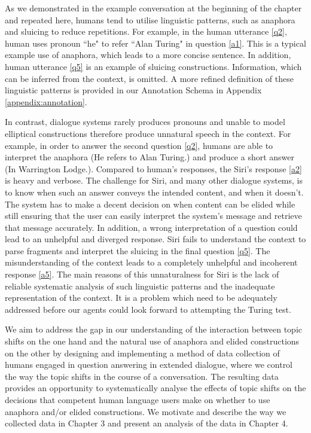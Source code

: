 \documentclass[bsc,frontabs,twoside,singlespacing,parskip,deptreport]{infthesis}     %
\begin{document}
As we demonstrated in the example conversation at the beginning of the chapter and repeated here, humans tend to utilise linguistic patterns, such as anaphora and sluicing to reduce repetitions. For example, in the human utterance \ref{q2}, human uses pronoun ``he" to refer ``Alan Turing" in question \ref{a1}. This is a typical example use of anaphora, which leads to a more concise sentence. In addition, human utterance \ref{q5} is an example of sluicing constructions. Information, which can be inferred from the context, is omitted. A more refined definition of these linguistic patterns is provided in our Annotation Schema in Appendix \ref{appendix:annotation}.

In contrast, dialogue systems rarely produces pronouns and unable to model elliptical constructions therefore produce unnatural speech in the context. For example, in order to answer the second question \ref{q2}, humans are able to interpret the anaphora (He refers to Alan Turing.) and produce a short answer (In Warrington Lodge.). Compared to human's responses, the Siri's response \ref{a2} is heavy and verbose. The challenge for Siri, and many other dialogue systems, is to know when such an answer conveys the intended content, and when it doesn't. The system has to make a decent decision on when content can be elided while still ensuring that the user can easily interpret the system's message and retrieve that message accurately. In addition, a wrong interpretation of a question could lead to an unhelpful and diverged response. Siri fails to understand the context to parse fragments and interpret the sluicing in the final question \ref{q5}. The misunderstanding of the context leads to a completely unhelpful and incoherent response \ref{a5}. The main reasons of this unnaturalness for Siri is the lack of reliable systematic analysis of such linguistic patterns and the inadequate representation of the context. It is a problem which need to be adequately addressed before our agents could look forward to attempting the Turing test.

We aim to address the gap in our understanding of the interaction between topic shifts on the one hand and the natural use of anaphora and elided constructions on the other by designing and implementing a method of data collection of humans engaged in question answering in extended dialogue, where we control the way the topic shifts in the course of a conversation. The resulting data provides an opportunity to systematically analyse the effects of topic shifts on the decisions that competent human language users make on whether to use anaphora and/or elided constructions. We motivate and describe the way we collected data in Chapter 3 and present an analysis of the data in Chapter 4.
\end{document}
